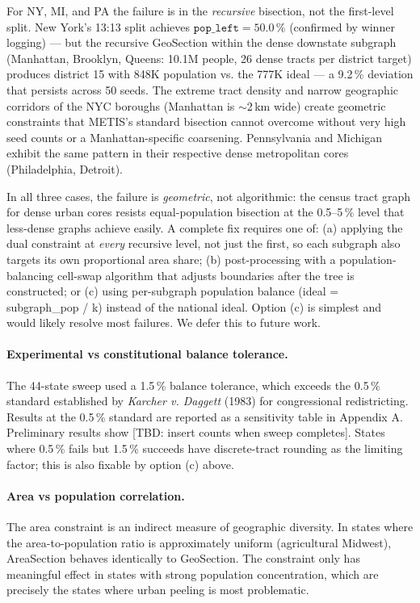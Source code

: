 For NY, MI, and PA the failure is in the \emph{recursive} bisection, not the
first-level split.
New York's 13:13 split achieves $\mathtt{pop\_left}=50.0\,\%$ (confirmed by
winner logging) --- but the recursive GeoSection within the dense downstate
subgraph (Manhattan, Brooklyn, Queens: 10.1M people, 26 dense tracts per
district target) produces district 15 with 848K population vs. the 777K ideal
--- a 9.2\,\% deviation that persists across 50 seeds.
The extreme tract density and narrow geographic corridors of the NYC boroughs
(Manhattan is $\sim$2\,km wide) create geometric constraints that METIS's
standard bisection cannot overcome without very high seed counts or a
Manhattan-specific coarsening.
Pennsylvania and Michigan exhibit the same pattern in their respective dense
metropolitan cores (Philadelphia, Detroit).

In all three cases, the failure is \emph{geometric}, not algorithmic: the
census tract graph for dense urban cores resists equal-population bisection at
the 0.5--5\,\% level that less-dense graphs achieve easily.
A complete fix requires one of:
(a) applying the dual constraint at \emph{every} recursive level, not just
    the first, so each subgraph also targets its own proportional area share;
(b) post-processing with a population-balancing cell-swap algorithm that
    adjusts boundaries after the tree is constructed; or
(c) using per-subgraph population balance (ideal = subgraph\_pop / k) instead
    of the national ideal.
Option (c) is simplest and would likely resolve most failures.
We defer this to future work.

\paragraph{Experimental vs constitutional balance tolerance.}
The 44-state sweep used a 1.5\,\% balance tolerance, which exceeds the
0.5\,\% standard established by \emph{Karcher v. Daggett} (1983) for
congressional redistricting.
Results at the 0.5\,\% standard are reported as a sensitivity table in
Appendix A.
Preliminary results show [TBD: insert counts when sweep completes].
States where 0.5\,\% fails but 1.5\,\% succeeds have discrete-tract rounding
as the limiting factor; this is also fixable by option (c) above.

\paragraph{Area vs population correlation.}
The area constraint is an indirect measure of geographic diversity.
In states where the area-to-population ratio is approximately uniform
(agricultural Midwest), AreaSection behaves identically to GeoSection.
The constraint only has meaningful effect in states with strong
population concentration, which are precisely the states where urban peeling
is most problematic.

